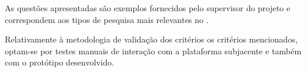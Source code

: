 As questões apresentadas são exemplos fornecidos pelo supervisor do projeto e correspondem aos tipos de pesquisa mais relevantes no {\productname}.

Relativamente à metodologia de validação dos critérios os critérios mencionados, optam-se por testes manuais de interação com a plataforma subjacente e também com o protótipo desenvolvido.
    
    





